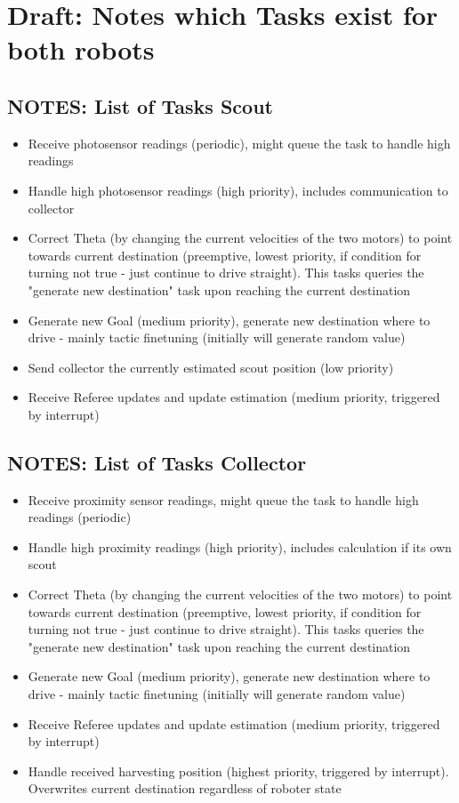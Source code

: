 \documentclass[12pt]{article}
\begin{document}
\lstset{language=C++}

\section*{Draft: Notes which Tasks exist for both robots}

\subsection*{NOTES: List of Tasks Scout}
\begin{itemize}
  \item Receive photosensor readings (periodic), might queue the task to handle high readings
  \item Handle high photosensor readings (high priority), includes communication to collector
  \item Correct Theta (by changing the current velocities of the two motors) to point towards current destination (preemptive, lowest priority, if condition for turning not true - just continue to drive straight). This tasks queries the "generate new destination" task upon reaching the current destination
  \item Generate new Goal (medium priority), generate new destination where to drive - mainly tactic finetuning (initially will generate random value)
  \item Send collector the currently estimated scout position (low priority)
  \item Receive Referee updates and update estimation (medium priority, triggered by interrupt)
\end{itemize}

\subsection*{NOTES: List of Tasks Collector}
\begin{itemize}
  \item Receive proximity sensor readings, might queue the task to handle high readings (periodic)
  \item Handle high proximity readings (high priority), includes calculation if its own scout
  \item Correct Theta (by changing the current velocities of the two motors) to point towards current destination (preemptive, lowest priority, if condition for turning not true - just continue to drive straight). This tasks queries the "generate new destination" task upon reaching the current destination
  \item Generate new Goal (medium priority), generate new destination where to drive - mainly tactic finetuning (initially will generate random value)
  \item Receive Referee updates and update estimation (medium priority, triggered by interrupt)
  \item Handle received harvesting position (highest priority, triggered by interrupt). Overwrites current destination regardless of roboter state
\end{itemize}
\end{document}
